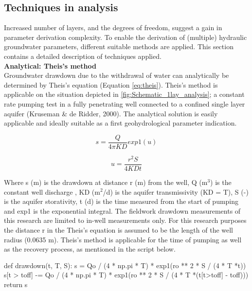 \subsection{Techniques in analysis}
\label{section:techniques_analysis}
Increased number of layers, and the degrees of freedom, suggest a gain in parameter derivation complexity. To enable the derivation of (multiple) hydraulic groundwater parameters, different suitable methods are applied. This section contains a detailed description of techniques applied. \\


\textbf{Analytical: Theis's method} \\ 
Groundwater drawdown due to the withdrawal of water can analytically be determined by Theis's equation (Equation \ref{eq:theis}). Theis's method is applicable on the situation depicted in \ref{fig:Schematic_1lay_analysis}; a constant rate pumping test in a fully penetrating well connected to a confined single layer aquifer (Kruseman \& de Ridder, 2000). The analytical solution is easily applicable and ideally suitable as a first geohydrological parameter indication.   

\begin{equation}
\label{eq:theis}
 s = \frac{Q}{4\pi K D} exp1(u)
\end{equation}

\begin{equation}
 u = \frac{r^{2} S}{4 K D t}
\end{equation}

Where s (m) is the drawdown at distance r (m) from the well, Q (m$^{3}$) is the constant well discharge , KD (m$^{2}$/d) is the aquifer transmissivity (KD = T), S (-) is the aquifer storativity, t (d) is the time measured from the start of pumping and exp1 is the exponential integral. The fieldwork drawdown measurements of this research are limited to in-well measurements only. For this research purposes the distance r in the Theis's equation is assumed to be the length of the well radius (0.0635 m). Theis's method is applicable for the time of pumping as well as the recovery process, as mentioned in the script below.\\

\begin{python}[h!]
def drawdown(t, T, S):
    s = Qo / (4 * np.pi * T) * exp1(ro ** 2 * S / (4 * T *t))
    s[t > toff] -= Qo / (4 * np.pi * T) * exp1(ro ** 2 * S / (4 * T *(t[t>toff] - toff)))   
    return s
\end{python}

